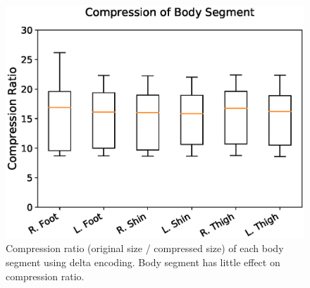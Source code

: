 \documentclass[journal]{IEEEtran}
\begin{document}
\begin{figure}

  \includegraphics[width=\linewidth]{segment.eps}
  \caption{Compression ratio (original size / compressed size) of each body segment using delta encoding. Body segment has little effect on compression ratio.}
  \label{fig:segments}
  
\end{figure}

\end{document}
